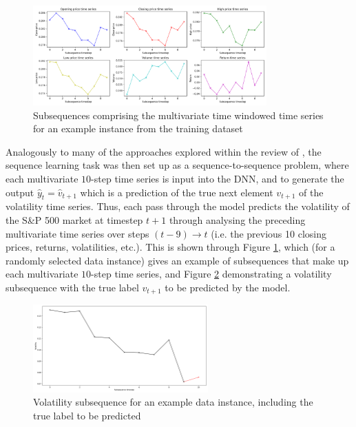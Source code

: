 \documentclass[a4paper, 11pt]{report}
\begin{document}
    \begin{figure}[ht]
        \label{fig: subsequences}
        \centering
        \includegraphics[width=0.8\textwidth]{subsequences.png}
        \caption{\centering Subsequences comprising the multivariate time windowed time series for an example instance from the training dataset}
    \end{figure}


    Analogously to many of the approaches explored within the review of \citet{sezer-2019}, the sequence learning task was then set up as a sequence-to-sequence problem, where each multivariate $10$-step time series is input into the DNN, and to generate the output $\hat{y}_t = \hat{v}_{t+1}$ which is a prediction of the true next element $v_{t+1}$ of the volatility time series. Thus, each pass through the model predicts the volatility of the S\&P 500 market at timestep $t+1$ through analysing the preceding multivariate time series over steps $(t-9) \to t$ (i.e. the previous 10 closing prices, returns, volatilities, etc.). This is shown through Figure \ref{fig: subsequences}, which (for a randomly selected data instance) gives an example of subsequences that make up each multivariate $10$-step time series, and Figure \ref{fig: volatility-subsequence} demonstrating a volatility subsequence with the true label $v_{t+1}$ to be predicted by the model.


    \begin{figure}[ht]
        \label{fig: volatility-subsequence}
        \centering
        \includegraphics[width=0.6\textwidth]{volatility-subsequence.png}
        \caption{\centering Volatility subsequence for an example data instance, including the true label to be predicted}
    \end{figure}
\end{document}

